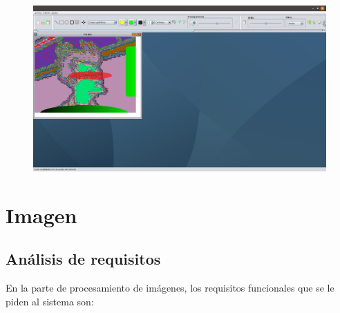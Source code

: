 \documentclass[11pt,a4paper]{article}
\begin{document}
\begin{itemize}
\begin{figure}[H]
	\end{figure}
	\begin{figure}[H]
	\centering
		\includegraphics[scale=0.2]{./img/15.png}
	\end{figure}
\end{itemize}

\newpage

\section{Imagen}

\subsection{Análisis de requisitos}
En la parte de procesamiento de imágenes, los requisitos funcionales que se le piden al sistema son:
\end{document}
